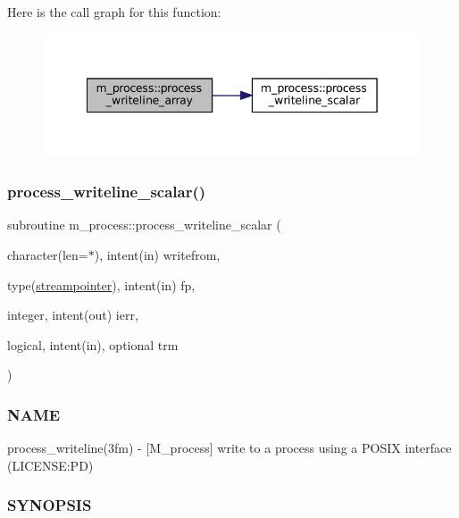 Here is the call graph for this function\+:\nopagebreak
\begin{figure}[H]
\begin{center}
\leavevmode
\includegraphics[width=342pt]{namespacem__process_a08887a918eba167ceacddf58ca084270_cgraph}
\end{center}
\end{figure}
\mbox{\label{namespacem__process_a72527c0ec0af26dcb14b8bfad6dcd482}} 
\subsubsection{\texorpdfstring{process\+\_\+writeline\+\_\+scalar()}{process\_writeline\_scalar()}}
{\footnotesize\ttfamily subroutine m\+\_\+process\+::process\+\_\+writeline\+\_\+scalar (\begin{DoxyParamCaption}\item[{character(len=$\ast$), intent(in)}]{writefrom,  }\item[{type(\mbox{\hyperlink{structm__process_1_1streampointer}{streampointer}}), intent(in)}]{fp,  }\item[{integer, intent(out)}]{ierr,  }\item[{logical, intent(in), optional}]{trm }\end{DoxyParamCaption})\hspace{0.3cm}{\ttfamily [private]}}



\subsubsection*{N\+A\+ME}

process\+\_\+writeline(3fm) -\/ \mbox{[}M\+\_\+process\mbox{]} write to a process using a P\+O\+S\+IX interface (L\+I\+C\+E\+N\+SE\+:PD) 

\subsubsection*{S\+Y\+N\+O\+P\+S\+IS}

